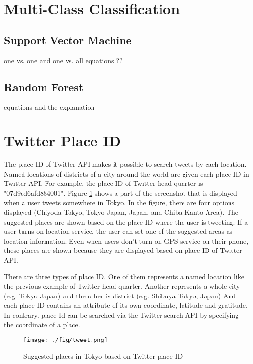 \section{Multi-Class Classification} 
\subsection{Support Vector Machine}
one vs. one and one vs. all
equations ??
\subsection{Random Forest}
equations and the explanation

\section{Twitter Place ID}\label{sec:placeid}
The place ID of Twitter API \cite{twitter_api_placeid} makes it possible to search tweets by each location. 
Named locations of districts of a city around the world are given each place ID in Twitter API.
For example, the place ID of Twitter head quarter is "07d9cd6afd884001".
Figure \ref{fig:tweet} shows a part of the screenshot that is displayed when a user tweets somewhere in Tokyo.
In the figure, there are four options displayed (Chiyoda Tokyo, Tokyo Japan, Japan, and Chiba Kanto Area).
The suggested places are shown based on the place ID where the user is tweeting.
If a user turns on location service, the user can set one of the suggested areas as location information. 
Even when users don't turn on GPS service on their phone, these places are shown because they are displayed based on place ID of Twitter API.

There are three types of place ID.
One of them represents a named location like the previous example of Twitter head quarter.
Another represents a whole city (e.g. Tokyo Japan) and the other is district (e.g. Shibuya Tokyo, Japan)
And each place ID contains an attribute of its own coordinate, latitude and gratitude.
In contrary, place Id can be searched via the Twitter search API by specifying the coordinate of a place.


\begin{figure}
	\centering
	\texttt{[image: ./fig/tweet.png]}
	\caption{Suggested places in Tokyo based on Twitter place ID}
	\label{fig:tweet}
\end{figure}

